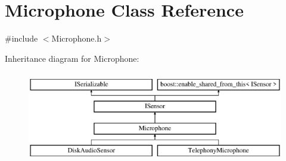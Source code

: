 \hypertarget{class_microphone}{}\section{Microphone Class Reference}
\label{class_microphone}


{\ttfamily \#include $<$Microphone.\+h$>$}

Inheritance diagram for Microphone\+:\begin{figure}[H]
\begin{center}
\leavevmode
\includegraphics[height=4.000000cm]{class_microphone}
\end{center}
\end{figure}
